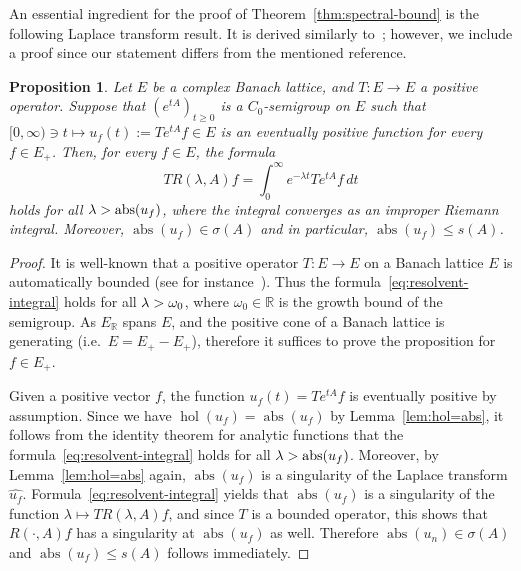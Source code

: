 \documentclass[sn-mathphys]{sn-jnl}%
\theoremstyle{thmstyleone}
\newtheorem{proposition}[theorem]{Proposition}
\theoremstyle{thmstylethree}
\DeclareMathOperator{\abs}{abs}
\DeclareMathOperator{\hol}{hol}
\let\Re\relax
\DeclareMathOperator{\Re}{Re}
\newcommand{\RR}{\mathbb{R}}
\begin{document}
An essential ingredient for the proof of Theorem~\ref{thm:spectral-bound} is the following Laplace transform result. It is derived similarly to~\cite[Proposition 6.1]{Ar21}; however, we include a proof since our statement differs from the mentioned reference.
\begin{proposition}
	\label{prop:hol=abs}
	Let $E$ be a complex Banach lattice, and $T:E\to E$ a positive operator. Suppose that $(e^{tA})_{t\ge 0}$ is a $C_0$-semigroup on $E$ such that $[0,\infty) \ni t \mapsto u_f(t):=Te^{tA}f\in E$ is an eventually positive function for every $f\in E_+$. Then, for every $f\in E$, the formula
	\begin{equation}
		\label{eq:resolvent-integral}
		T R(\lambda,A)f = \int_0^\infty e^{-\lambda t}Te^{tA}f\,dt
	\end{equation}
	holds for all $\Re\lambda>\abs(u_f)$, where the integral converges as an improper Riemann integral. Moreover, $\abs(u_f)\in\sigma(A)$ and in particular, $\abs(u_f)\le s(A)$.
\end{proposition}
\begin{proof}
	It is well-known that a positive operator $T:E\to E$ on a Banach lattice $E$ is automatically bounded (see for instance~\cite[Theorem 4.3]{AB}). Thus the formula~\eqref{eq:resolvent-integral} holds for all $\Re\lambda>\omega_0$, where $\omega_0\in\RR$ is the growth bound of the semigroup. As $E_\RR$ spans $E$, and the positive cone of a Banach lattice is generating (i.e.\ $E=E_+-E_+$), therefore it suffices to prove the proposition for $f\in E_+$. 
	
	Given a positive vector $f$, the function $u_f(t)=Te^{tA}f$ is eventually positive by assumption. Since we have $\hol(u_f)=\abs(u_f)$ by Lemma~\ref{lem:hol=abs}, it follows from the identity theorem for analytic functions that the formula~\eqref{eq:resolvent-integral} holds for all $\Re\lambda>\abs(u_f)$. Moreover, by Lemma~\ref{lem:hol=abs} again, $\abs(u_f)$ is a singularity of the Laplace transform $\widehat{u_f}$. Formula~\eqref{eq:resolvent-integral} yields that $\abs(u_f)$ is a singularity of the function $\lambda\mapsto TR(\lambda,A)f$, and since $T$ is a bounded operator, this shows that $R(\cdot,A)f$ has a singularity at $\abs(u_f)$ as well. Therefore $\abs(u_n)\in\sigma(A)$ and $\abs(u_f)\le s(A)$ follows immediately.
\end{proof}
\end{document}
